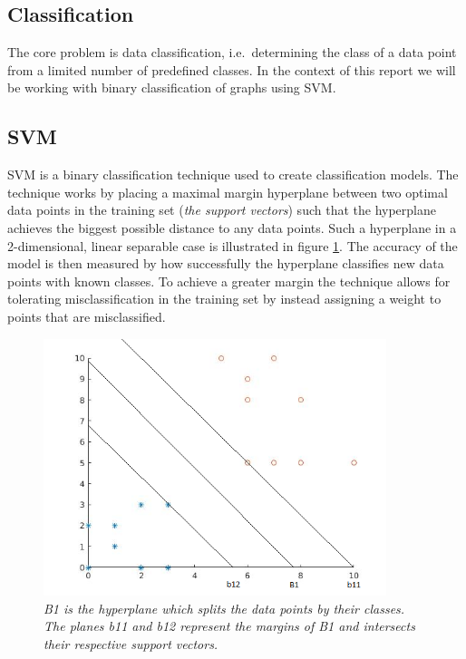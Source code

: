 \documentclass{article}
\begin{document}
\subsection{Classification}
The core problem is data classification, i.e.\ determining the class of a data point from a limited number of predefined classes. In the context of this report we will be working with binary classification of graphs using SVM.

\subsection{SVM}
SVM is a binary classification technique used to create classification models. The technique works by placing a maximal margin hyperplane between two optimal data points in the training set (\textit{the support vectors}) such that the hyperplane achieves the biggest possible distance to any data points. Such a hyperplane in a 2-dimensional, linear separable case is illustrated in figure \ref{fig:hyperplane}. The accuracy of the model is then measured by how successfully the hyperplane classifies new data points with known classes. To achieve a greater margin the technique allows for tolerating misclassification in the training set by instead assigning a weight to points that are misclassified.

\begin{figure}[H]
	\centering
	\includegraphics[width=10cm]{svm_plot}
	\caption{\textit{B1 is the hyperplane which splits the data points by their classes. The planes b11 and b12 represent the margins of B1 and intersects their respective support vectors.}}
	\label{fig:hyperplane}
\end{figure}
\end{document}
